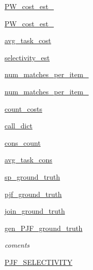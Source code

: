 \begin{DoxyCompactItemize}
\item 
\hyperlink{classdynamicfilterapp_1_1models_1_1_join_a83384c5efb00056d72e62f54090f162c}{P\+W\+\_\+cost\+\_\+est\+\_}
\item 
\hyperlink{classdynamicfilterapp_1_1models_1_1_join_a813429f929973d3f9b0d2f8e7f6b7c23}{P\+W\+\_\+cost\+\_\+est\+\_}
\item 
\hyperlink{classdynamicfilterapp_1_1models_1_1_join_a70729c52cf346cc8c79b2879f728cb99}{avg\+\_\+task\+\_\+cost}
\item 
\hyperlink{classdynamicfilterapp_1_1models_1_1_join_a69583dd8724a5380d6c68ce2edffe2d6}{selectivity\+\_\+est}
\item 
\hyperlink{classdynamicfilterapp_1_1models_1_1_join_a8cdba12f778c1ea03188373763c48eb7}{num\+\_\+matches\+\_\+per\+\_\+item\+\_}
\item 
\hyperlink{classdynamicfilterapp_1_1models_1_1_join_a8a9a495627c79f7bc67544c66197dd1c}{num\+\_\+matches\+\_\+per\+\_\+item\+\_}
\item 
\hyperlink{classdynamicfilterapp_1_1models_1_1_join_a6760579c97fc985690cdd3386effeb3c}{count\+\_\+costs}
\item 
\hyperlink{classdynamicfilterapp_1_1models_1_1_join_af3dc8873acbdc1634b41af003969d465}{call\+\_\+dict}
\item 
\hyperlink{classdynamicfilterapp_1_1models_1_1_join_ace3682116362edac4f94c633d82de3fb}{cons\+\_\+count}
\item 
\hyperlink{classdynamicfilterapp_1_1models_1_1_join_a59361dbf99fd8ba09b0b618a50d6c3b8}{avg\+\_\+task\+\_\+cons}
\item 
\hyperlink{classdynamicfilterapp_1_1models_1_1_join_a26373c16feba2f10410b78ea16841a21}{sp\+\_\+ground\+\_\+truth}
\item 
\hyperlink{classdynamicfilterapp_1_1models_1_1_join_a1ec302901059810f84b7fa227156b2e9}{pjf\+\_\+ground\+\_\+truth}
\item 
\hyperlink{classdynamicfilterapp_1_1models_1_1_join_a9bf599bb9db1e1a1e07cebc7424a15a7}{join\+\_\+ground\+\_\+truth}
\item 
\hyperlink{classdynamicfilterapp_1_1models_1_1_join_abbd60e6de881162d4729a417f6083f0c}{gen\+\_\+\+P\+J\+F\+\_\+ground\+\_\+truth}
\begin{DoxyCompactList}\small\item\em coments \end{DoxyCompactList}\item 
\hyperlink{classdynamicfilterapp_1_1models_1_1_join_af9a4b7069818f836f5a3324c440c367d}{P\+J\+F\+\_\+\+S\+E\+L\+E\+C\+T\+I\+V\+I\+TY}

\end{DoxyCompactItemize}
